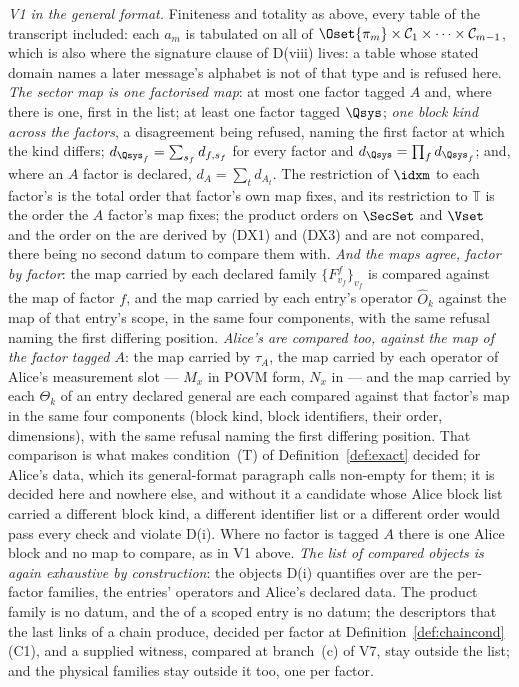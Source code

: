 \begin{definition}
\emph{V1 in the general format.} Finiteness and totality as above, every
table of the transcript included: each $a_m$ is tabulated on all of
$\Oset{\pi_m}\times\mathcal{C}_1\times\dots\times\mathcal{C}_{m-1}$, which is
also where the signature clause of D(viii) lives: a table whose stated
domain names a later message's alphabet is not of that type and is refused
here. \emph{The sector map is one factorised map}: at most one factor tagged
$A$ and, where there is one, first in the list; at least one factor tagged
$\Qsys$; \emph{one block kind across the factors}, a disagreement being
refused, naming the first factor at which the kind differs;
$d_{\Qsys_f}=\sum_{s_f}d_{f,s_f}$ for every factor and
$d_{\Qsys}=\prod_fd_{\Qsys_f}$; and, where an $A$ factor is declared,
$d_A=\sum_td_{A_t}$. The restriction of $\idxm$ to each factor's 
is the total order that factor's own map fixes, and its restriction to
$\mathbb{T}$ is the order the $A$ factor's map fixes; the product orders on
$\SecSet$ and $\Vset$ and the order on the  are derived
by (DX1) and (DX3) and are not compared, there being no second datum to
compare them with. \emph{And the maps agree, factor by factor}: the map
carried by each declared family $\{F^{f}_{v_f}\}_{v_f}$ is compared against
the map of factor $f$, and the map carried by each entry's operator
$\hat O_k$ against the map of that entry's scope, in the same four
components, with the same refusal naming the first differing position.
\emph{Alice's  are compared too, against the map of the
factor tagged $A$}: the map carried by $\tau_A$, the map carried by each
operator of Alice's measurement slot --- $M_x$ in POVM form, $N_x$ in
 --- and the map carried by each $\Theta_k$ of an entry declared
general are each compared against that factor's map in the same four
components (block kind, block identifiers, their order, dimensions), with the
same refusal naming the first differing position. That comparison is what
makes condition~(T) of Definition~\ref{def:exact} decided for Alice's data,
which its general-format paragraph calls non-empty for them; it is decided
here and nowhere else, and without it a candidate whose Alice block list
carried a different block kind, a different identifier list or a different
order would pass every check and violate D(i). Where no factor is tagged $A$
there is one Alice block and no map to compare, as in V1 above. \emph{The list
of compared objects is again exhaustive by construction}: the objects D(i)
quantifies over are the per-factor families, the entries' operators and
Alice's declared data. The product family is no datum, and the
 of a scoped entry is no datum; the descriptors that the
last links of a chain produce, decided per factor at
Definition~\ref{def:chaincond}\,(C1), and a supplied witness, compared at
branch~(c) of V7, stay outside the list; and the physical families stay outside
it too, one per factor.


\end{definition}
